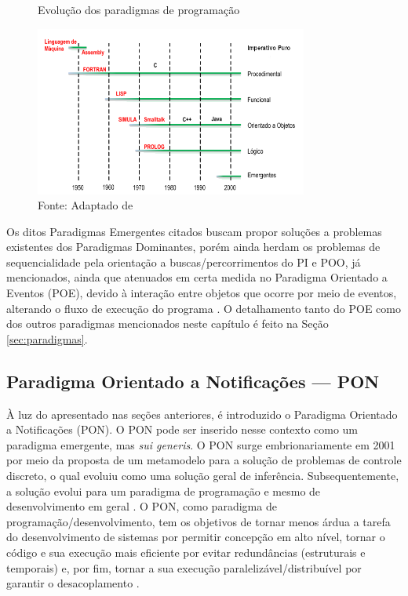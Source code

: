 \begin{figure}[!htb]
  \centering
  \caption{Evolução dos paradigmas de programação}
  \includegraphics[width=0.8\textwidth]{../figures/evolucao.png}
  \caption*{Fonte: Adaptado de }
  \label{fig:evolucao}
\end{figure}

Os ditos Paradigmas Emergentes citados buscam propor soluções a problemas
existentes dos Paradigmas Dominantes, porém ainda herdam os problemas de
sequencialidade pela orientação a buscas/percorrimentos do PI e POO, já
mencionados, ainda que atenuados em certa medida no Paradigma Orientado a
Eventos (POE), devido à interação entre objetos que ocorre por meio de eventos,
alterando o fluxo de execução do programa \cite{ferg_2006}. O detalhamento tanto
do POE como dos outros paradigmas mencionados neste capítulo é feito na Seção
\ref{sec:paradigmas}.

\subsection{Paradigma Orientado a Notificações — PON}\label{sec:pon}

À luz do apresentado nas seções anteriores, é introduzido o Paradigma Orientado
a Notificações (PON). O PON pode ser inserido nesse contexto como um paradigma
emergente, mas \textit{sui generis}. O PON surge embrionariamente em 2001 por
meio da proposta de um metamodelo para a solução de problemas de controle
discreto, o qual evoluiu como uma solução geral de inferência. Subsequentemente,
a solução evolui para um paradigma de programação e mesmo de desenvolvimento em
geral
\cite{simao_livro_2002,doc_simao_2005,pat_simao_2008,simao_2009,doc_ronszcka_2019}.
O PON, como paradigma de programação/desenvolvimento, tem os objetivos de tornar
menos árdua a tarefa do desenvolvimento de sistemas por permitir concepção em
alto nível, tornar o código e sua execução mais eficiente por evitar
redundâncias (estruturais e temporais) e, por fim, tornar a sua execução
paralelizável/distribuível por garantir o desacoplamento \cite{simao_2009}.

